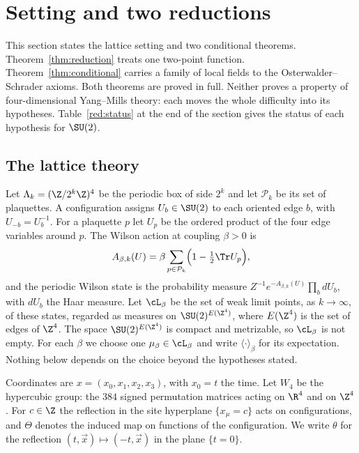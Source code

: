 \section{Setting and two reductions}\label{sec:reduction}

This section states the lattice setting and two conditional theorems. Theorem~\ref{thm:reduction} treats one two-point function. Theorem~\ref{thm:conditional} carries a family of local fields to the Osterwalder--Schrader axioms. Both theorems are proved in full. Neither proves a property of four-dimensional Yang--Mills theory: each moves the whole difficulty into its hypotheses. Table~\ref{red:status} at the end of the section gives the status of each hypothesis for $\SU(2)$.

\subsection{The lattice theory}\label{red:setting}

Let $\Lambda_k=(\Z/2^k\Z)^4$ be the periodic box of side $2^k$ and let $\mathcal{P}_k$ be its set of plaquettes. A configuration assigns $U_b\in\SU(2)$ to each oriented edge $b$, with $U_{-b}=U_b^{-1}$. For a plaquette $p$ let $U_p$ be the ordered product of the four edge variables around $p$. The Wilson action at coupling $\beta>0$ is
\begin{equation}\label{red:action}
  A_{\beta,k}(U)=\beta\sum_{p\in\mathcal{P}_k}\Bigl(1-\tfrac12\Tr U_p\Bigr),
\end{equation}
and the periodic Wilson state is the probability measure $Z^{-1}e^{-A_{\beta,k}(U)}\prod_b dU_b$, with $dU_b$ the Haar measure. Let $\cL_\beta$ be the set of weak limit points, as $k\to\infty$, of these states, regarded as measures on $\SU(2)^{E(\Z^4)}$, where $E(\Z^4)$ is the set of edges of $\Z^4$. The space $\SU(2)^{E(\Z^4)}$ is compact and metrizable, so $\cL_\beta$ is not empty. For each $\beta$ we choose one $\mu_\beta\in\cL_\beta$ and write $\langle\cdot\rangle_\beta$ for its expectation. Nothing below depends on the choice beyond the hypotheses stated.

Coordinates are $x=(x_0,x_1,x_2,x_3)$, with $x_0=t$ the time. Let $W_4$ be the hypercubic group: the $384$ signed permutation matrices acting on $\R^4$ and on $\Z^4$. For $c\in\Z$ the reflection in the site hyperplane $\{x_\mu=c\}$ acts on configurations, and $\Theta$ denotes the induced map on functions of the configuration. We write $\theta$ for the reflection $(t,\vec x)\mapsto(-t,\vec x)$ in the plane $\{t=0\}$.

